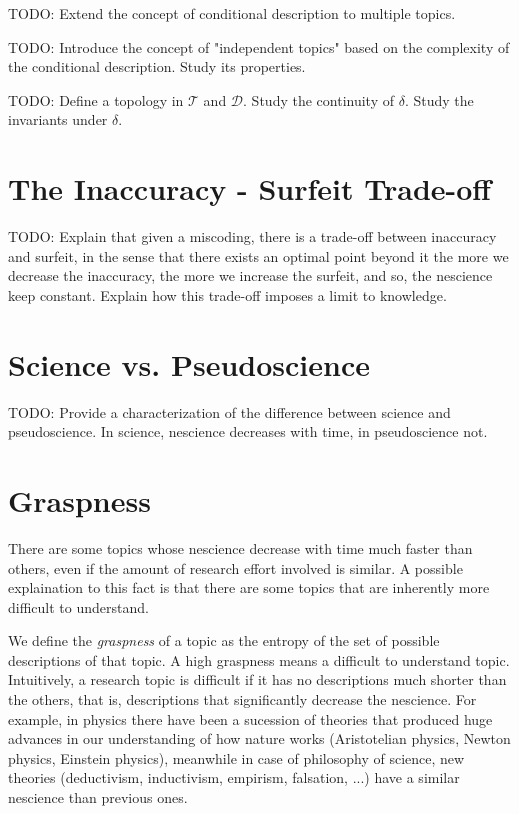{\color{red} TODO: Extend the concept of conditional description to multiple topics.}

{\color{red} TODO: Introduce the concept of "independent topics" based on the complexity of the conditional description. Study its properties.}

{\color{red} TODO: Define a topology in $\mathcal{T}$ and $\mathcal{D}$. Study the continuity of $\delta$. Study the invariants under $\delta$.}


%
%

\section{The Inaccuracy - Surfeit Trade-off}

{\color{red} TODO: Explain that given a miscoding, there is a trade-off between inaccuracy and surfeit, in the sense that there exists an optimal point beyond it the more we decrease the inaccuracy, the more we increase the surfeit, and so, the nescience keep constant. Explain how this trade-off imposes a limit to knowledge.}

%
%

\section{Science vs. Pseudoscience}

{\color{red} TODO: Provide a characterization of the difference between science and pseudoscience. In science, nescience decreases with time, in pseudoscience not.}

%
%
\section{Graspness}

There are some topics whose nescience decrease with time much faster than others, even if the amount of research effort involved is similar. A possible explaination to this fact is that there are some topics that are inherently more difficult to understand.

We define the \emph{graspness} of a topic as the entropy of the set of possible descriptions of that topic. A high graspness means a difficult to understand topic. Intuitively, a research topic is difficult if it has no descriptions much shorter than the others, that is, descriptions that significantly decrease the nescience. For example, in physics there have been a sucession of theories that produced huge advances in our understanding of how nature works (Aristotelian physics, Newton physics, Einstein physics), meanwhile in case of philosophy of science, new theories (deductivism, inductivism, empirism, falsation, ...) have a similar nescience than previous ones.

